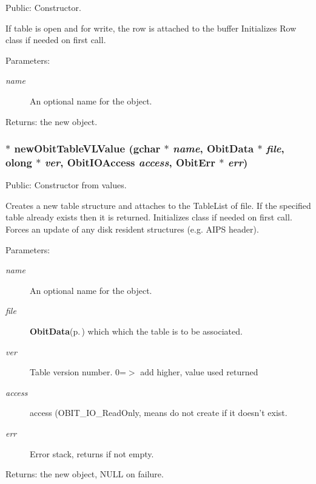 Public: Constructor. 

If table is open and for write, the row is attached to the buffer Initializes Row class if needed on first call. \begin{Desc}
\item[Parameters:]
\begin{description}
\item[{\em name}]An optional name for the object. \end{description}
\end{Desc}
\begin{Desc}
\item[Returns:]the new object. \end{Desc}
\subsubsection{$\ast$ new\-Obit\-Table\-VLValue (gchar $\ast$ {\em name}, {\bf Obit\-Data} $\ast$ {\em file}, {\bf olong} $\ast$ {\em ver}, Obit\-IOAccess {\em access}, {\bf Obit\-Err} $\ast$ {\em err})}\label{ObitTableVL_8h_a12}


Public: Constructor from values. 

Creates a new table structure and attaches to the Table\-List of file. If the specified table already exists then it is returned. Initializes class if needed on first call. Forces an update of any disk resident structures (e.g. AIPS header). \begin{Desc}
\item[Parameters:]
\begin{description}
\item[{\em name}]An optional name for the object. \item[{\em file}]{\bf Obit\-Data}{\rm (p.\,\pageref{structObitData})} which which the table is to be associated. \item[{\em ver}]Table version number. 0=$>$ add higher, value used returned \item[{\em access}]access (OBIT\_\-IO\_\-Read\-Only, means do not create if it doesn't exist. \item[{\em err}]Error stack, returns if not empty. \end{description}
\end{Desc}
\begin{Desc}
\item[Returns:]the new object, NULL on failure. \end{Desc}
